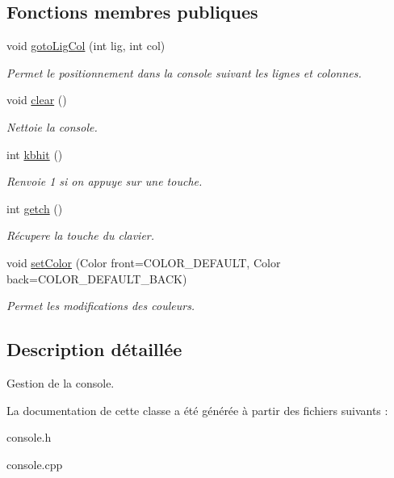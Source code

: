\subsection*{Fonctions membres publiques}
\begin{DoxyCompactItemize}
\item 
void \hyperlink{classConsole_acfa13c1ba733eaa7de5182ca14a54ce1}{goto\+Lig\+Col} (int lig, int col)\hypertarget{classConsole_acfa13c1ba733eaa7de5182ca14a54ce1}{}\label{classConsole_acfa13c1ba733eaa7de5182ca14a54ce1}

\begin{DoxyCompactList}\small\item\em Permet le positionnement dans la console suivant les lignes et colonnes. \end{DoxyCompactList}\item 
void \hyperlink{classConsole_a8b4ffaeabbea48e1f3aa1e535ee88ab8}{clear} ()\hypertarget{classConsole_a8b4ffaeabbea48e1f3aa1e535ee88ab8}{}\label{classConsole_a8b4ffaeabbea48e1f3aa1e535ee88ab8}

\begin{DoxyCompactList}\small\item\em Nettoie la console. \end{DoxyCompactList}\item 
int \hyperlink{classConsole_aae56ae7e713cb582fff7be7dd1b9f034}{kbhit} ()\hypertarget{classConsole_aae56ae7e713cb582fff7be7dd1b9f034}{}\label{classConsole_aae56ae7e713cb582fff7be7dd1b9f034}

\begin{DoxyCompactList}\small\item\em Renvoie 1 si on appuye sur une touche. \end{DoxyCompactList}\item 
int \hyperlink{classConsole_a0fd1fe1bdd711540991cc8a19f994201}{getch} ()\hypertarget{classConsole_a0fd1fe1bdd711540991cc8a19f994201}{}\label{classConsole_a0fd1fe1bdd711540991cc8a19f994201}

\begin{DoxyCompactList}\small\item\em Récupere la touche du clavier. \end{DoxyCompactList}\item 
void \hyperlink{classConsole_a0863977db7f233075ba98febdbcf3218}{set\+Color} (Color front=C\+O\+L\+O\+R\+\_\+\+D\+E\+F\+A\+U\+LT, Color back=C\+O\+L\+O\+R\+\_\+\+D\+E\+F\+A\+U\+L\+T\+\_\+\+B\+A\+CK)\hypertarget{classConsole_a0863977db7f233075ba98febdbcf3218}{}\label{classConsole_a0863977db7f233075ba98febdbcf3218}

\begin{DoxyCompactList}\small\item\em Permet les modifications des couleurs. \end{DoxyCompactList}\end{DoxyCompactItemize}


\subsection{Description détaillée}
Gestion de la console. 

La documentation de cette classe a été générée à partir des fichiers suivants \+:\begin{DoxyCompactItemize}
\item 
console.\+h\item 
console.\+cpp\end{DoxyCompactItemize}
